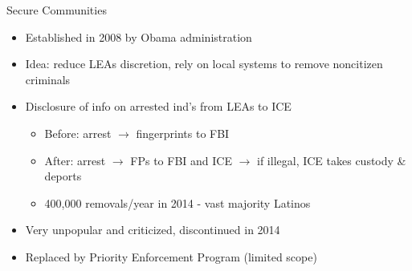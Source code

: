\documentclass[xcolor=pdftex,dvipsnames,table,handout]{beamer}
\begin{document}



\begin{frame}[label = sc]{Secure Communities}
\begin{itemize}
\item Established in 2008 by Obama administration \vspace{0.20cm}
\item Idea: reduce LEAs discretion, rely on local systems to remove noncitizen criminals \vspace{0.20cm}
\item Disclosure of info on arrested ind's from LEAs to ICE
\begin{itemize} \vspace{0.10cm}
\item Before: arrest $\rightarrow$ fingerprints to FBI  \vspace{0.10cm}
\item After: arrest $\rightarrow$ FPs to FBI and ICE $\rightarrow$ if illegal, ICE takes custody \& deports\vspace{0.10cm}
\item  400,000 removals/year in 2014 - vast majority Latinos
\end{itemize}\vspace{0.20cm}
\item Very unpopular and criticized, discontinued in 2014\vspace{0.20cm}
\item Replaced by Priority Enforcement Program (limited scope)
\end{itemize}
\hyperlink{history}{}
\end{frame}
\end{document}
